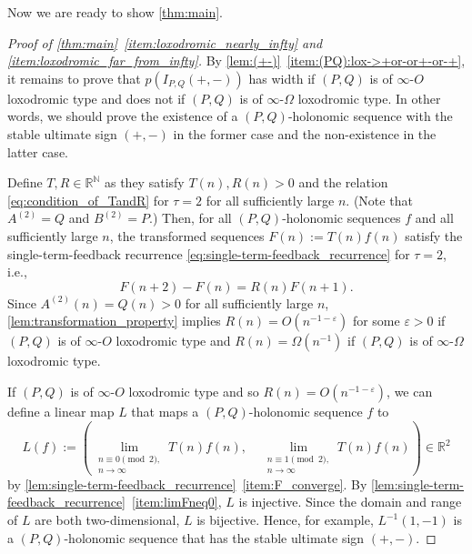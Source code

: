 \documentclass[a4paper,UKenglish,cleveref,autoref,thm-restate]{lipics-v2021}
\newcommand{\R}{\mathbb{R}}
\newcommand{\N}{\mathbb{N}}
\begin{document}
Now we are ready to show \cref{thm:main}. 

\begin{proof}[Proof of \cref{thm:main}~\eqref{item:loxodromic_nearly_infty} and \eqref{item:loxodromic_far_from_infty}]
By \cref{lem:(+-)}~\eqref{item:(PQ):lox->+or-or+-or-+}, it remains to prove that $p(I_{P, Q}(+, -))$ has width if $(P, Q)$ is of $\infty$-$O$ loxodromic type and does not if $(P, Q)$ is of $\infty$-$\Omega$ loxodromic type. In other words, we should prove the existence of a $(P, Q)$-holonomic sequence with the stable ultimate sign $(+, -)$ in the former case and the non-existence in the latter case. 

Define $T, R \in \R^{\N}$ as they satisfy $T(n), R(n) > 0$ and the relation \eqref{eq:condition_of_TandR} for $\tau = 2$ for all sufficiently large $n$. (Note that $A^{(2)} = Q$ and $B^{(2)} = P$.) Then, for all $(P, Q)$-holonomic sequences $f$ and all sufficiently large $n$, the transformed sequences $F(n) := T(n)f(n)$ satisfy the single-term-feedback recurrence \eqref{eq:single-term-feedback_recurrence} for $\tau = 2$, i.e.,
\begin{equation} \label{eq:single-term-feedback_recurrence_with_tau=2}
F(n+2) - F(n) = R(n) F(n+1).
\end{equation}
Since $A^{(2)}(n) = Q(n) > 0$ for all sufficiently large $n$, \cref{lem:transformation_property} implies $R(n) = O(n^{-1-\varepsilon})$ for some $\varepsilon > 0$ if $(P, Q)$ is of $\infty$-$O$ loxodromic type and $R(n) = \Omega(n^{-1})$ if $(P, Q)$ is of $\infty$-$\Omega$ loxodromic type. 

If $(P, Q)$ is of $\infty$-$O$ loxodromic type and so $R(n) = O(n^{-1-\varepsilon})$, we can define a linear map $L$ that maps a $(P, Q)$-holonomic sequence $f$ to 
\[
L(f) := \left( \lim\limits_{\substack{n \equiv 0 \pmod{2}, \\ n \to \infty}} T(n)f(n), \quad \lim\limits_{\substack{n \equiv 1 \pmod{2}, \\ n \to \infty}} T(n)f(n) \right) \in \R^2
\]
by \cref{lem:single-term-feedback_recurrence}~\eqref{item:F_converge}. 
By \cref{lem:single-term-feedback_recurrence}~\eqref{item:limFneq0}, $L$ is injective. Since the domain and range of $L$ are both two-dimensional, $L$ is bijective. Hence, for example, $L^{-1}(1, -1)$ is a $(P, Q)$-holonomic sequence that has the stable ultimate sign $(+, -)$. 


\end{proof}
\end{document}
